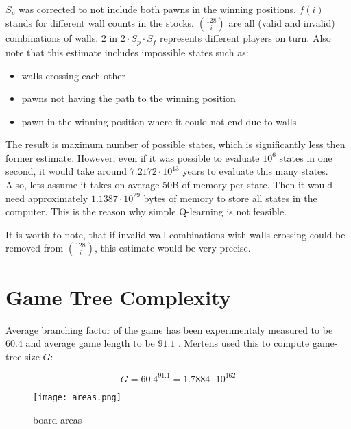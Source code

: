 $S_p$ was corrected to not include both pawns in the winning positions.
$f(i)$ %
stands for different wall counts in the stocks.
${128 \choose i}$ are all (valid and invalid) combinations of walls.
$2$ in $2{\cdot} S_p {\cdot} S_f$ represents different players on turn.
Also note that this estimate includes impossible states such as:
\begin{itemize}
  \vspace*{-0.30cm}
  \setlength\itemsep{-0.25cm}
  \item walls crossing each other
  \item pawns not having the path to the winning position
  \item pawn in the winning position where it could not end due to walls
  \vspace*{-0.25cm}
\end{itemize}

The result is maximum number of possible states, which is significantly
less then former estimate. However, even if it was possible to evaluate $10^{6}$
states in one second, it would take around $7.2172{\cdot}10^{13}$ years to
evaluate this many states. Also, lets assume it takes on average 50B
of memory per state. Then it would need approximately
$1.1387{\cdot}10^{29}$ bytes of memory to store all states in the
computer. This is the reason why simple Q-learning is not feasible.

It is worth to note, that if invalid wall combinations with walls crossing
could be removed from ${128 \choose i}$, this estimate would be very precise.

\section{Game Tree Complexity}
Average branching factor of the game has been experimentaly measured to be
$60.4$ and average game length to be $91.1$ \cite{glendenning}.
Mertens \cite{mertens} used this to compute game-tree size $G$:
\begin{center}
  \vspace*{-1.30cm}
  \begin{equation}
    \label{eqn:mgtc}
    G = 60.4^{91.1} = 1.7884{\cdot}10^{162}
  \end{equation}
  \vspace*{-1.30cm}
\end{center}

\begin{wrapfigure}{r}{0.38\textwidth}
  \vspace*{-0.45cm}
  \centering
  \texttt{[image: areas.png]}
  \vspace*{-0.30cm}
  \caption{board areas}
  \label{fig:areas}
  \vspace*{-0.60cm}
\end{wrapfigure}


